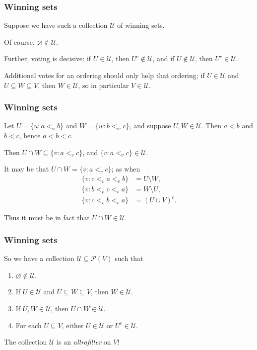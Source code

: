 \documentclass{beamer}
\theoremstyle{definition}
\begin{document}
\begin{frame}
    \frametitle{Winning sets}

    Suppose we have such a collection $\mathcal{U}$ of winning sets.

    \pause
    Of course, $\varnothing \notin \mathcal{U}$.

    \pause
    Further, voting is decisive: if $U \in \mathcal{U}$, then $U^c \notin \mathcal{U}$, and if $U \notin \mathcal{U}$, then $U^c \in \mathcal{U}$.

    \pause
    Additional votes for an ordering should only help that ordering; if $U \in \mathcal{U}$ and $U \subseteq W \subseteq V$, then $W \in \mathcal{U}$,
    so in particular $V \in \mathcal{U}$.

\end{frame}

\begin{frame}
    \frametitle{Winning sets}
    
    Let $U = \{u : a <_u b\}$ and $W = \{w : b <_w c\}$, and suppose $U, W \in \mathcal{U}$. Then $a < b$ and $b < c$, hence $a < b < c$.
    
    \pause
    Then $U \cap W \subseteq \{v : a <_v c\}$, and $\{v : a <_v c\} \in \mathcal{U}$.

    \pause
    It may be that $U \cap W = \{v : a <_v c\}$; as when
    \begin{align*}
        \{v : c <_v a <_v b\} &= U \setminus W, \\
        \{v : b <_v c <_v a\} &= W \setminus U, \\
        \{v : c <_v b <_v a\} &= (U \cup V)^c.
    \end{align*}

    \pause
    Thus it must be in fact that $U \cap W \in \mathcal{U}$.

\end{frame}

\begin{frame}
    \frametitle{Winning sets}

    So we have a collection $\mathcal{U} \subseteq \mathcal{P}(V)$ such that
    \begin{enumerate}
        \item $\varnothing \notin \mathcal{U}$.
        \item If $U \in \mathcal{U}$ and $U \subseteq W \subseteq V$, then $W \in \mathcal{U}$.
        \item If $U, W \in \mathcal{U}$, then $U \cap W \in \mathcal{U}$.
        \item For each $U \subseteq V$, either $U \in \mathcal{U}$ or $U^c \in \mathcal{U}$.
    \end{enumerate}

    \pause
    The collection $\mathcal{U}$ is an \emph{ultrafilter} on $V$!

\end{frame}
\end{document}
